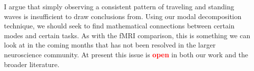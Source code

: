 I argue that simply observing a consistent pattern of traveling and standing waves is insufficient to draw conclusions from. Using our modal decomposition technique, we should seek to find mathematical connections between certain modes and certain tasks. As with the fMRI comparison, this is something we can look at in the coming months that has not been resolved in the larger neuroscience community. At present this issue is \textbf{\textcolor{red}{open}} in both our work and the broader literature.








